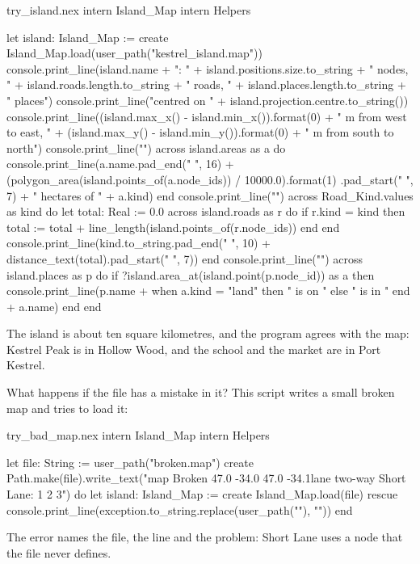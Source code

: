 \begin{tryit}{try_island.nex}
intern Island_Map
intern Helpers

let island: Island_Map := create Island_Map.load(user_path("kestrel_island.map"))
console.print_line(island.name + ": " + island.positions.size.to_string + " nodes, "
  + island.roads.length.to_string + " roads, " + island.places.length.to_string + " places")
console.print_line("centred on " + island.projection.centre.to_string())
console.print_line((island.max_x() - island.min_x()).format(0) + " m from west to east, "
  + (island.max_y() - island.min_y()).format(0) + " m from south to north")
console.print_line("")
across island.areas as a do
  console.print_line(a.name.pad_end(" ", 16) + (polygon_area(island.points_of(a.node_ids)) / 10000.0).format(1)
    .pad_start(" ", 7) + " hectares of " + a.kind)
end
console.print_line("")
across Road_Kind.values as kind do
  let total: Real := 0.0
  across island.roads as r do
    if r.kind = kind then
      total := total + line_length(island.points_of(r.node_ids))
    end
  end
  console.print_line(kind.to_string.pad_end(" ", 10) + distance_text(total).pad_start(" ", 7))
end
console.print_line("")
across island.places as p do
  if ?island.area_at(island.point(p.node_id)) as a then
    console.print_line(p.name + when a.kind = "land" then " is on " else " is in " end + a.name)
  end
end
\end{tryit}

The island is about ten square kilometres, and the program agrees with the
map: Kestrel Peak is in Hollow Wood, and the school and the market are in
Port Kestrel.

What happens if the file has a mistake in it? This script writes a small
broken map and tries to load it:

\begin{tryit}{try_bad_map.nex}
intern Island_Map
intern Helpers

let file: String := user_path("broken.map")
create Path.make(file).write_text("map Broken 47.0 -34.0 47.0 -34.1\nroad lane two-way Short Lane: 1 2 3\n")
do
  let island: Island_Map := create Island_Map.load(file)
rescue
  console.print_line(exception.to_string.replace(user_path(""), ""))
end
\end{tryit}

The error names the file, the line and the problem: Short Lane uses a node
that the file never defines.
